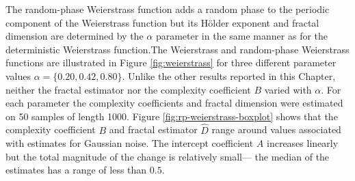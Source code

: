 The random-phase Weierstrass function adds a random 
phase to the periodic component of the Weierstrass function 
but its H\"older exponent and fractal dimension are 
determined by the $\alpha$ parameter
in the same manner as for the deterministic 
Weierstrass function.The Weierstrass and 
random-phase Weierstrass functions are
 illustrated in Figure \ref{fig:weierstrass} 
for three different parameter values $
\alpha = \{ 0.20, 0.42, 0.80 \}$. Unlike the other 
results reported in this Chapter, neither the 
fractal estimator nor the complexity coefficient 
$B$ varied with $\alpha$. For each parameter the complexity coefficients 
and fractal dimension were estimated on 50 
samples of length 1000. Figure 
\ref{fig:rp-weierstrass-boxplot} shows that the 
complexity coefficient $B$ and
fractal estimator $\hat D$ range around values 
associated with estimates for Gaussian noise.
The intercept coefficient $A$ increases 
linearly but the total magnitude of the change is 
relatively small--- the median of the estimates has a range 
of less than $0.5$. 



